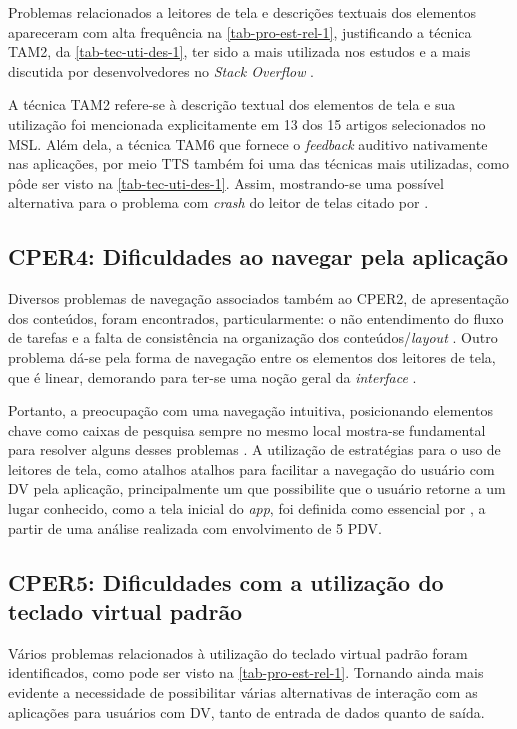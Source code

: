 Problemas relacionados a leitores de tela e descrições textuais dos elementos apareceram com alta frequência na \autoref{tab-pro-est-rel-1},
justificando a técnica TAM2, da \autoref{tab-tec-uti-des-1}, ter sido a mais utilizada nos estudos e a mais discutida por
desenvolvedores no \emph{Stack Overflow} \cite{Vendome201941}.

A técnica TAM2 refere-se à descrição textual dos elementos de tela e sua utilização foi mencionada explicitamente em 13 dos
15 artigos selecionados no MSL\@. Além dela, a técnica TAM6 que fornece o \emph{feedback} auditivo nativamente nas aplicações,
por meio TTS também foi uma das técnicas mais utilizadas, como pôde ser visto na \autoref{tab-tec-uti-des-1}. Assim, mostrando-se
uma possível alternativa para o problema com \emph{crash} do leitor de telas citado por .

\subsection{CPER4: Dificuldades ao navegar pela aplicação}

Diversos problemas de navegação associados também ao CPER2, de apresentação dos conteúdos, foram encontrados, particularmente:
o não entendimento do fluxo de tarefas e a falta de consistência na organização dos conteúdos/\emph{layout}
\cite{Shera2021285,Christoph2020,Quispe2020}. Outro problema dá-se pela forma de navegação entre os elementos dos leitores de tela,
que é linear, demorando para ter-se uma noção geral da \emph{interface} \cite{Damaceno2016}.

Portanto, a preocupação com uma navegação intuitiva, posicionando elementos chave como caixas de pesquisa sempre no mesmo
local mostra-se fundamental para resolver alguns desses problemas \cite{Kim20191103,Mascetti2019,Ducci2018}.
A utilização de estratégias para o uso de leitores de tela, como atalhos atalhos para facilitar a navegação do usuário com DV
pela aplicação, principalmente um que possibilite que o usuário retorne a um lugar conhecido, como a tela inicial do \emph{app},
foi definida como essencial por , a partir de uma análise realizada com envolvimento de 5 PDV\@.

\subsection{CPER5: Dificuldades com a utilização do teclado virtual padrão}

Vários problemas relacionados à utilização do teclado virtual padrão foram identificados, como pode ser visto na
\autoref{tab-pro-est-rel-1}. Tornando ainda mais evidente a necessidade de possibilitar várias alternativas de interação
com as aplicações para usuários com DV\@, tanto de entrada de dados quanto de saída.


